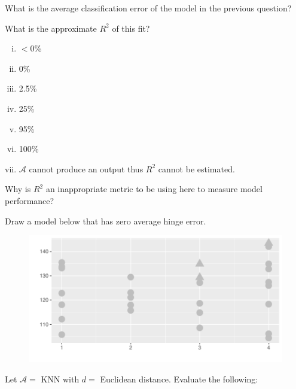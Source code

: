 \documentclass[12pt]{article}
\begin{document}

 What is the average classification error of the model in the previous question?

  What is the approximate $R^2$ of this fit?

\begin{enumerate}[i)]
\item $<$0\%
\item 0\%
\item 2.5\%
\item 25\%
\item 95\%
\item 100\%
\item $\mathcal{A}$ cannot produce an output thus $R^2$ cannot be estimated.
\end{enumerate}

  Why is $R^2$ an inappropriate metric to be using here to measure model performance?

%
%



 Draw a model below that has zero average hinge error.


\begin{figure}[htp]
\centering
\includegraphics[width=6in]{nonlinsep_trace}
\end{figure}


 Let $\mathcal{A} = $ KNN with $d = $ Euclidean distance. Evaluate the following:
\end{document}
